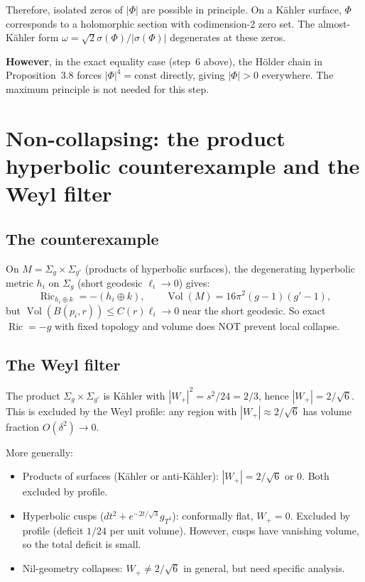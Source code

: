 Therefore, isolated zeros of \(|\Phi|\) are possible in principle.  On a
K\"ahler surface, \(\Phi\) corresponds to a holomorphic section with
codimension-2 zero set.  The almost-K\"ahler form \(\omega=\sqrt2\sigma(\Phi)/|\sigma(\Phi)|\) degenerates at these zeros.

\textbf{However}, in the exact equality case (step~6 above), the H\"older
chain in Proposition~3.8 forces \(|\Phi|^4=\text{const}\) directly, giving
\(|\Phi|>0\) everywhere.  The maximum principle is not needed for this step.

\section{Non-collapsing: the product hyperbolic counterexample and the Weyl filter}

\subsection{The counterexample}

On \(M=\Sigma_g\times\Sigma_{g'}\) (products of hyperbolic surfaces),
the degenerating hyperbolic metric \(h_i\) on \(\Sigma_g\) (short geodesic
\(\ell_i\to0\)) gives:
\[
  \operatorname{Ric}_{h_i\oplus k}=-(h_i\oplus k),\qquad
  \operatorname{Vol}(M)=16\pi^2(g-1)(g'-1),
\]
but \(\operatorname{Vol}(B(p_i,r))\le C(r)\ell_i\to0\) near the short
geodesic.  So exact \(\operatorname{Ric}=-g\) with fixed topology and
volume does NOT prevent local collapse.

\subsection{The Weyl filter}

The product \(\Sigma_g\times\Sigma_{g'}\) is K\"ahler with
\(|W_+|^2=s^2/24=2/3\), hence \(|W_+|=2/\sqrt6\).
This is excluded by the Weyl profile: any region with
\(|W_+|\approx2/\sqrt6\) has volume fraction \(O(\delta^2)\to0\).

More generally:
\begin{itemize}
\item Products of surfaces (K\"ahler or anti-K\"ahler):
  \(|W_+|=2/\sqrt6\) or \(0\). Both excluded by profile.
\item Hyperbolic cusps (\(dt^2+e^{-2t/\sqrt3}g_{T^3}\)):
  conformally flat, \(W_+=0\). Excluded by profile (deficit \(1/24\) per
  unit volume).  However, cusps have vanishing volume, so the total
  deficit is small.
\item Nil-geometry collapses: \(W_+\ne2/\sqrt6\) in general, but need
  specific analysis.
\end{itemize}

